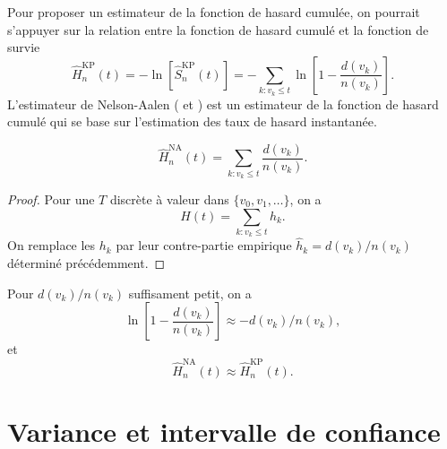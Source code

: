 Pour proposer un estimateur de la fonction de hasard cumulée, on pourrait s'appuyer sur la relation entre la fonction de hasard cumulé et la fonction de survie
$$
\widehat{H}^{\text{KP}}_n(t) = -\ln\left[\widehat{S}^{\text{KP}}_n(t)\right] = -\sum_{k:v_k\leq t}\ln\left[1-\frac{d(v_k)}{n(v_k)}\right].
$$
L'estimateur de Nelson-Aalen (\citet{Nelson1972} et \citet{Aalen1978}) est un estimateur de la fonction de hasard cumulé qui se base sur l'estimation des taux de hasard instantanée.
\begin{coro}
$$
\widehat{H}_n^{\text{NA}}(t) = \sum_{k:v_k\leq t}\frac{d(v_k)}{n(v_k)}.
$$
\end{coro}
\begin{proof}
Pour une \va $T$ discrète à valeur dans $\{v_0, v_1,\ldots\}$, on a 
$$
H(t) = \sum_{k:v_k\leq t} h_k.
$$
On remplace les $h_k$ par leur contre-partie empirique $\widehat{h}_k = d(v_k)/n(v_k)$ déterminé précédemment.
\end{proof}
\begin{remark}
Pour $d(v_k)/n(v_k)$ suffisament petit, on a 
$$
\ln\left[1-\frac{d(v_k)}{n(v_k)}\right]\approx -d(v_k)/n(v_k),
$$ 
et 
$$\widehat{H}_n^{\text{NA}}(t)\approx \widehat{H}_n^{\text{KP}}(t).$$
\end{remark}

\section{Variance et intervalle de confiance}
